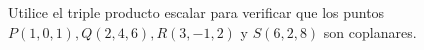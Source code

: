 \item Utilice el triple producto escalar para verificar que los puntos $P(1, 0, 1), Q(2, 4, 6), R(3, -1, 2)$ y $S(6, 2, 8)$ son coplanares.
